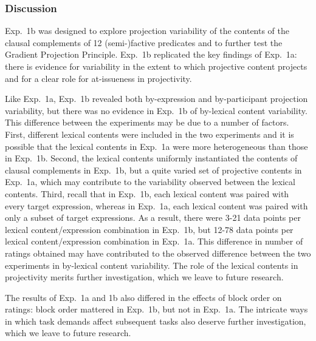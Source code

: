 \documentclass[11pt,fleqn]{article}
\newcommand{\6}{\mbox{$[\hspace*{-.6mm}[$}}
\newcommand{\9}{\mbox{$]\hspace*{-.6mm}]$}}
\begin{document}
%
%
%
%


\subsubsection{Discussion}

Exp.~1b was designed to explore projection variability of the contents of the clausal complements of 12 (semi-)factive predicates and to further test the Gradient Projection Principle. Exp.~1b replicated the key findings of Exp.~1a: there is evidence for variability in the extent to which projective content projects and for a clear role for at-issueness in projectivity.

Like Exp.~1a, Exp.~1b revealed both by-expression and by-participant projection variability, but there was no evidence in Exp.~1b of by-lexical content variability. This difference between the experiments may be due to a number of factors. First, different lexical contents were included in the two experiments and it is possible that the lexical contents in Exp.~1a were more heterogeneous than those in Exp.~1b. Second, the lexical contents uniformly instantiated the contents of clausal complements in Exp.~1b, but a quite varied set of projective contents in Exp.~1a, which may contribute to the variability observed between the lexical contents. Third, recall that in Exp.~1b, each lexical content was paired with every target expression, whereas in Exp.~1a, each lexical content was paired with only a subset of target expressions. As a result, there were 3-21 data points per lexical content/expression combination in Exp.~1b, but 12-78 data points per lexical content/expression combination in Exp.~1a. This difference in number of ratings obtained may have contributed to the observed difference between the two experiments in by-lexical content variability. The role of the lexical contents in projectivity merits further investigation, which we leave to future research. 

The results of Exp.~1a and 1b also differed in the effects of block order on ratings: block order mattered in Exp.~1b, but not in Exp.~1a. The intricate ways in which task demands affect subsequent tasks also deserve further investigation, which we leave to future research.
\end{document}
